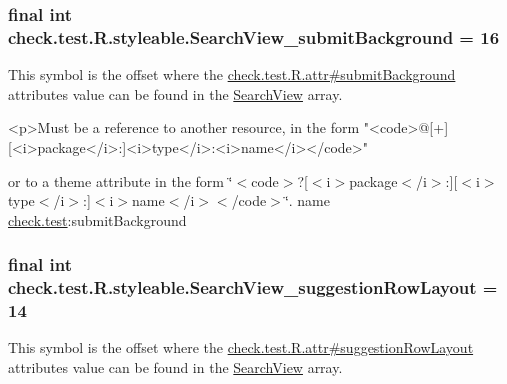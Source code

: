 \subsubsection[{Search\+View\+\_\+submit\+Background}]{\setlength{\rightskip}{0pt plus 5cm}final int check.\+test.\+R.\+styleable.\+Search\+View\+\_\+submit\+Background = 16\hspace{0.3cm}{\ttfamily [static]}}\label{classcheck_1_1test_1_1_r_1_1styleable_a85d86db6e7bedfaa5d09b84a2324b42b}
This symbol is the offset where the \hyperlink{classcheck_1_1test_1_1_r_1_1attr_a5fe58849f07f3b5684db0abc31d73d52}{check.\+test.\+R.\+attr\#submit\+Background} attribute\textquotesingle{}s value can be found in the \hyperlink{classcheck_1_1test_1_1_r_1_1styleable_af133609668e9a4263b21387e9a7574f8}{Search\+View} array.

\begin{DoxyVerb}      <p>Must be a reference to another resource, in the form "<code>@[+][<i>package</i>:]<i>type</i>:<i>name</i></code>"
\end{DoxyVerb}
 or to a theme attribute in the form \char`\"{}$<$code$>$?\mbox{[}$<$i$>$package$<$/i$>$\+:\mbox{]}\mbox{[}$<$i$>$type$<$/i$>$\+:\mbox{]}$<$i$>$name$<$/i$>$$<$/code$>$\char`\"{}.  name \hyperlink{namespacecheck_1_1test}{check.\+test}\+:submit\+Background \hypertarget{classcheck_1_1test_1_1_r_1_1styleable_a017153f998c419cbe736bd819098f898}{}
\subsubsection[{Search\+View\+\_\+suggestion\+Row\+Layout}]{\setlength{\rightskip}{0pt plus 5cm}final int check.\+test.\+R.\+styleable.\+Search\+View\+\_\+suggestion\+Row\+Layout = 14\hspace{0.3cm}{\ttfamily [static]}}\label{classcheck_1_1test_1_1_r_1_1styleable_a017153f998c419cbe736bd819098f898}
This symbol is the offset where the \hyperlink{classcheck_1_1test_1_1_r_1_1attr_aa1d2db971e8289c75a03c38ae25812e1}{check.\+test.\+R.\+attr\#suggestion\+Row\+Layout} attribute\textquotesingle{}s value can be found in the \hyperlink{classcheck_1_1test_1_1_r_1_1styleable_af133609668e9a4263b21387e9a7574f8}{Search\+View} array.

